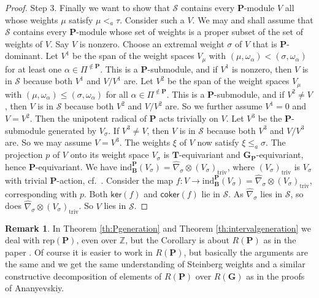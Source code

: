 \documentclass[sn-mathphys-num]{sn-jnl}%
\newcommand\tS{{\mathcal S}}
\newcommand{\rep}{{\mathrm{rep}}}
\newcommand{\ind}{{\mathrm{ind}}}
\newcommand{\triv}{{\mathrm{triv}}}
\newcommand{\coker}{{\mathsf{coker}}}
\newcommand{\kernel}{{\mathsf{ker}}}
\newcommand{\Z}{{\mathbb Z}}
\newcommand{\bg}{\mathbf G}
\newcommand{\fb}{\mathbf B}
\newcommand{\bt}{\mathbf T}
\newcommand{\bp}{\mathbf P}
\theoremstyle{definition}
\newtheorem{remark}[theorem]{Remark}
\begin{document}
\begin{proof}
Step 3.
Finally we want to show that $\tS$ contains every  $\bp$-module $V$ all whose weights $\mu$ satisfy $\mu<_a\tau$.
Consider such a $V$.
We may and shall assume  that $\tS$ contains every  $\bp$-module
 whose set of weights is a proper subset of the set of weights of $V$.
Say $V$ is nonzero. Choose an extremal weight $\sigma$ of $V$ that is $\bp$-dominant.
Let $V^1$ be the span of the weight spaces $V_\mu$ with $(\mu,\omega_\alpha)<(\sigma,\omega_\alpha)$ for at least one
$\alpha\in \Pi^{\notin \bp}$. This is a $\bp$-submodule, and if $V^1$ is nonzero, then $V$ is in $\tS$ because both
$V^1$ and $V/V^1$ are. 
Let $V^2$ be the span of the weight spaces $V_\mu$ with $(\mu,\omega_\alpha)\leq(\sigma,\omega_\alpha)$ for all
$\alpha\in \Pi^{\notin \bp}$. This is a $\bp$-submodule, and if $V^2\not= V$, then $V$ is in $\tS$ because both
$V^2$ and $V/V^2$ are. 
So we further assume $V^1=0$ and $V=V^2$. Then  the unipotent radical of $\bp$ acts trivially
on $V$. Let $V^3$ be the $\bp$-submodule generated by $V_\sigma$.
If $V^3\not= V$, then $V$ is in $\tS$ because both
$V^3$ and $V/V^3$ are. So we may assume $V=V^3$. The weights $\xi$ of $V$ now
satisfy $\xi\leq_a\sigma$.
The projection $p$ of $V$ onto its weight space $V_\sigma$ is $\bt$-equivariant and $\bg_\bp$-equivariant,
hence $\bp$-equivariant. We have  $\ind_\fb^\bp(V_\sigma)=\hat\nabla_\sigma\otimes (V_{\sigma})_\triv$, 
where $(V_{\sigma})_\triv$ is $V_{\sigma}$
with trivial $\bp$-action, cf.\ \cite[Proposition 17]{FvdK}. Consider the map $f:V\to \ind_\fb^\bp(V_\sigma)=\hat\nabla_\sigma\otimes (V_{\sigma})_\triv$, corresponding with $p$. Both $\kernel(f)$ and $\coker(f)$ lie in $\tS$. 
As $\hat\nabla_\sigma$ lies in $\tS$, so does $\hat\nabla_\sigma\otimes (V_{\sigma})_\triv$.
So $V$ lies in $\tS$.
\end{proof}


\begin{remark}
    In  Theorem \ref{th:Pgeneration}
    and
    Theorem \ref{th:intervalgeneration} we deal with $\rep(\bp)$,
    even over $\Z$,
    but the Corollary is about $R(\bp)$ as in the paper \cite{Ana}. Of course it is easier to work in $R(\bp)$, but basically the arguments are the same and we get the same understanding of Steinberg weights and a similar constructive decomposition of elements of $R(\bp)$ over $R(\bg)$ as in the proofs of Ananyevskiy.
\end{remark}
\end{document}
